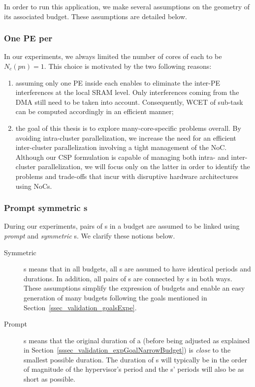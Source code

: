 \documentclass[main.tex]{subfiles}
\begin{document}
In order to run this application, we make several assumptions on the geometry of its associated budget. These assumptions are detailed below.
\subsubsection{One PE per \PN{}}
In our experiments, we always limited the number of cores of each \PN{} to be $N_c(pn)=1$. This choice is motivated by the two following reasons:
\begin{enumerate}
    \item assuming only one PE inside each \PN{} enables to eliminate the inter-PE interferences at the local SRAM level. Only interferences coming from the DMA still need to be taken into account. Consequently, WCET of sub-task can be computed accordingly in an efficient manner;
    \item the goal of this thesis is to explore many-core-specific problems overall. By avoiding intra-cluster parallelization, we increase the need for an efficient inter-cluster parallelization involving a tight management of the NoC. Although our CSP formulation is capable of managing both intra- and inter-cluster parallelization, we will focus only on the latter in order to identify the problems and trade-offs that incur with disruptive hardware architectures using NoCs.
\end{enumerate}

\subsubsection{Prompt symmetric \PC{}s}
During our experiments, pairs of \PN{}s in a budget are assumed to be linked using \emph{prompt} and \emph{symmetric} \PC{}s. We clarify these notions below.
\begin{description}
    \item[Symmetric] \PC{}s means that in all budgets, all \PC{}s are assumed to have identical periods and durations. In addition, all pairs of \PN{}s are connected by \PC{}s in both ways. These assumptions simplify the expression of budgets and enable an easy generation of many budgets following the goals mentioned in Section~\ref{ssec_validation_goalsExpe}.
    \item[Prompt ] \PC{}s means that the original duration of a \PC{} (before being adjusted as explained in Section~\ref{sssec_validation_expGoalNarrowBudget}) is \emph{close} to the smallest possible \PC{} duration. The duration of \PC{}s will typically be in the order of magnitude of the hypervisor's period and the \PC{}s' periods will also be as short as possible.
\end{description}
\end{document}
